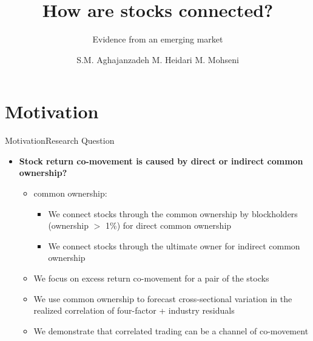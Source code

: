 \documentclass{beamer}
\title[Connected Stocks ]{How are stocks connected? }
\subtitle{Evidence from an emerging market}
\author[Aghajanzadeh, Heidari \& Mohseni]{S.M. Aghajanzadeh \qquad M. Heidari \qquad M. Mohseni }
\institute[TeIAS]{Tehran Institute for Advanced Studies }
\begin{document}
	\maketitle
	
	
	
	\section{Motivation}
	
	
	
	\begin{frame}{Motivation}{Research Question}
		
		\begin{itemize}
			\item\textbf{Stock return co-movement is caused by direct or indirect common ownership?}
			\begin{itemize}
				\item common ownership:
				\begin{itemize}
					\item We connect stocks through the common ownership by blockholders (ownership $ > $ 1\%) for direct common ownership
					\item We connect stocks through the ultimate owner for indirect common ownership
				\end{itemize}
				\item We focus on excess return co-movement for a pair of the stocks
				\item We use common ownership to forecast cross-sectional variation in the realized correlation of four-factor + industry residuals
				\item We demonstrate that correlated trading can be a channel of co-movement
			\end{itemize}
		\end{itemize}
		
	\end{frame}
	
\end{document}
